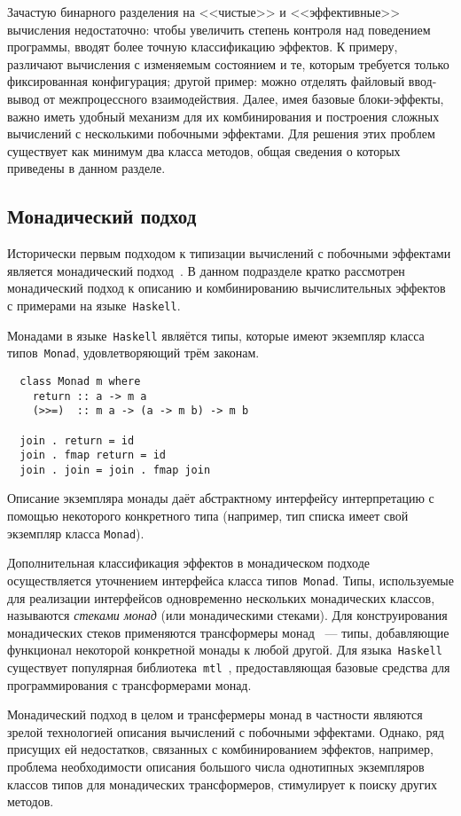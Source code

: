 \documentclass [a4paper] {article}
\begin{document}
Зачастую бинарного разделения на <<чистые>> и <<эффективные>>
вычисления недостаточно: чтобы увеличить степень контроля над поведением программы,
вводят более точную классификацию эффектов. К примеру, различают вычисления с изменяемым
состоянием и те, которым требуется только фиксированная конфигурация;
другой пример: можно отделять файловый ввод-вывод от межпроцессного взаимодействия. Далее, имея
базовые блоки-эффекты, важно иметь удобный механизм для их комбинирования и
построения сложных вычислений с несколькими побочными эффектами. Для решения
этих проблем существует как минимум два класса методов, общая сведения о которых приведены в данном разделе.

\subsection{Монадический подход}

Исторически первым подходом к типизации вычислений с побочными эффектами
является монадический подход~\cite{Moggi:1989:CLM:77350.77353}. В данном подразделе
кратко рассмотрен монадический подход к описанию и комбинированию
вычислительных эффектов с примерами на языке~\texttt{Haskell}.

Монадами в языке~\texttt{Haskell} являётся типы, которые имеют экземпляр
класса типов~\texttt{Monad}, удовлетворяющий трём законам.
\begin{verbatim}
  class Monad m where
    return :: a -> m a
    (>>=)  :: m a -> (a -> m b) -> m b

  join . return = id
  join . fmap return = id
  join . join = join . fmap join
\end{verbatim}
Описание экземпляра монады даёт абстрактному интерфейсу
интерпретацию с помощью некоторого конкретного типа (например, тип списка имеет свой экземпляр класса \texttt{Monad}).

Дополнительная классификация эффектов в монадическом подходе осуществляется
уточнением интерфейса класса типов~\texttt{Monad}. Типы, используемые для реализации
интерфейсов одновременно нескольких
монадических классов, называются \emph{стеками монад} (или монадическими стеками). Для конструирования
монадических стеков применяются трансформеры монад~\cite{monadTransformers}
--- типы,
добавляющие функционал некоторой конкретной монады к любой другой. Для
языка~\texttt{Haskell} существует популярная библиотека~\texttt{mtl}~\cite{mtlHackage},
предоставляющая базовые средства для программирования с трансформерами монад.

Монадический подход в целом и трансфермеры монад в частности являются зрелой
технологией описания вычислений с побочными эффектами.
Однако, ряд присущих ей недостатков, связанных с комбинированием эффектов,
например, проблема необходимости описания большого числа однотипных
экземпляров классов типов для монадических трансформеров, стимулирует к поиску других методов.
\end{document}
